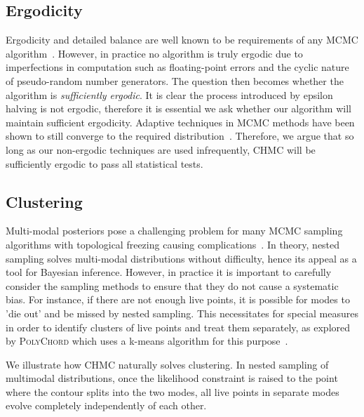 \documentclass[11pt]{article}
\begin{document}
    \subsection{Ergodicity}
    Ergodicity and detailed balance are well known to be requirements of any MCMC algorithm~\cite{Metropolis_OG}.
    However, in practice no algorithm is truly ergodic due to imperfections in computation such as floating-point
    errors and the cyclic nature of pseudo-random number generators.
    The question then becomes whether the algorithm is \emph{sufficiently ergodic}.
    It is clear the process introduced by epsilon halving is not ergodic, therefore it is essential we ask
    whether our algorithm will maintain sufficient ergodicity.
    Adaptive techniques in MCMC methods have been shown to still converge to the required
    distribution~\cite{MCMC_Ergodicity}.
    Therefore, we argue that so long as our non-ergodic techniques are used infrequently, CHMC will be sufficiently
    ergodic to pass all statistical tests.

    \subsection{Clustering}

    Multi-modal posteriors pose a challenging problem for many MCMC sampling algorithms with topological freezing
    causing complications~\cite{mangoubi2018_HMC_Multimodal}.
    In theory, nested sampling solves multi-modal distributions without difficulty, hence its appeal as a tool for
    Bayesian inference.
    However, in practice it is important to carefully consider the sampling methods to ensure that they do not
    cause a systematic bias.
    For instance, if there are not enough live points, it is possible for modes to 'die out' and be missed by nested
    sampling.
    This necessitates for special measures in order to identify clusters of live points and treat them separately,
    as explored by \textsc{PolyChord} which uses a k-means algorithm for this purpose~\cite{Handley_polychord}.

    We illustrate how CHMC naturally solves clustering.
    In nested sampling of multimodal distributions, once the likelihood constraint is raised to the point where the
    contour splits into the two modes, all live points in separate modes evolve completely independently of each other.
\end{document}
